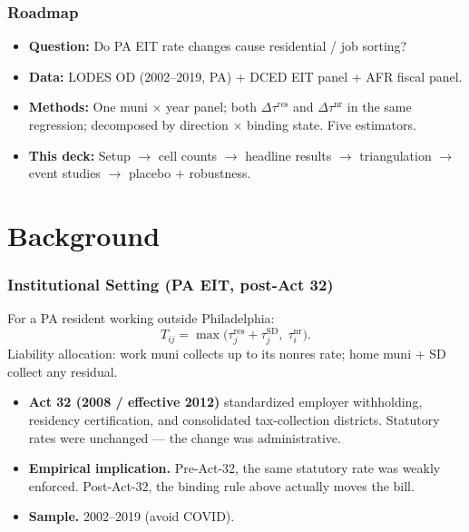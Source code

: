 \documentclass[xcolor = x11names, compress, aspectratio = 169]{beamer}
\begin{document}
    \begin{frame}
    \frametitle{Roadmap}
        \begin{itemize}\setlength{\itemsep}{0.15cm}
            \item \textbf{Question:} Do PA EIT rate changes cause residential / job sorting?
            \item \textbf{Data:} LODES OD (2002--2019, PA) + DCED EIT panel + AFR fiscal panel.
            \item \textbf{Methods:} One muni $\times$ year panel; both
            $\Delta\tau^{\text{res}}$ and $\Delta\tau^{\text{nr}}$ in the same regression;
            decomposed by direction $\times$ binding state. Five estimators.
            \item \textbf{This deck:} Setup $\to$ cell counts $\to$ headline
            results $\to$ triangulation $\to$ event studies $\to$ placebo + robustness.
        \end{itemize}
    \end{frame}

\section{Background}

    \begin{frame}
    \frametitle{Institutional Setting (PA EIT, post-Act 32)}
        \footnotesize
        For a PA resident working outside Philadelphia:
        \[
            T_{ij} = \max\!\bigl(\tau^{\text{res}}_j + \tau^{\text{SD}}_j,\; \tau^{\text{nr}}_i\bigr).
        \]
        Liability allocation: work muni collects up to its nonres rate;
        home muni + SD collect any residual.
        \medskip

        \begin{itemize}\setlength{\itemsep}{0.10cm}
            \item \textbf{Act 32 (2008 / effective 2012)} standardized
            employer withholding, residency certification, and consolidated
            tax-collection districts. Statutory rates were unchanged ---
            the change was administrative.
            \item \textbf{Empirical implication.} Pre-Act-32, the same
            statutory rate was weakly enforced. Post-Act-32, the binding
            rule above actually moves the bill.
            \item \textbf{Sample.} 2002--2019 (avoid COVID).
        \end{itemize}
    \end{frame}
\end{document}

